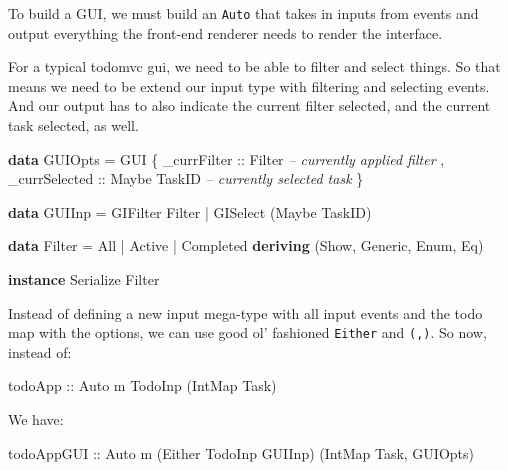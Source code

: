 \documentclass[]{article}
\newenvironment{Shaded}{}{}
\newcommand{\KeywordTok}[1]{\textcolor[rgb]{0.00,0.44,0.13}{\textbf{{#1}}}}
\newcommand{\DataTypeTok}[1]{\textcolor[rgb]{0.56,0.13,0.00}{{#1}}}
\newcommand{\CommentTok}[1]{\textcolor[rgb]{0.38,0.63,0.69}{\textit{{#1}}}}
\newcommand{\OtherTok}[1]{\textcolor[rgb]{0.00,0.44,0.13}{{#1}}}
\newcommand{\FunctionTok}[1]{\textcolor[rgb]{0.02,0.16,0.49}{{#1}}}
\newcommand{\NormalTok}[1]{{#1}}
\begin{document}
To build a GUI, we must build an \texttt{Auto} that takes in inputs from events
and output everything the front-end renderer needs to render the interface.

For a typical todomvc gui, we need to be able to filter and select things. So
that means we need to be extend our input type with filtering and selecting
events. And our output has to also indicate the current filter selected, and the
current task selected, as well.

\begin{Shaded}
\begin{Highlighting}[]
\KeywordTok{data} \DataTypeTok{GUIOpts} \FunctionTok{=} \DataTypeTok{GUI} \NormalTok{\{ _}\OtherTok{currFilter   ::} \DataTypeTok{Filter}        \CommentTok{-- currently applied filter}
                   \NormalTok{, _}\OtherTok{currSelected ::} \DataTypeTok{Maybe} \DataTypeTok{TaskID}  \CommentTok{-- currently selected task}
                   \NormalTok{\}}

\KeywordTok{data} \DataTypeTok{GUIInp} \FunctionTok{=} \DataTypeTok{GIFilter} \DataTypeTok{Filter}
            \FunctionTok{|} \DataTypeTok{GISelect} \NormalTok{(}\DataTypeTok{Maybe} \DataTypeTok{TaskID}\NormalTok{)}

\KeywordTok{data} \DataTypeTok{Filter} \FunctionTok{=} \DataTypeTok{All} \FunctionTok{|} \DataTypeTok{Active} \FunctionTok{|} \DataTypeTok{Completed}
            \KeywordTok{deriving} \NormalTok{(}\DataTypeTok{Show}\NormalTok{, }\DataTypeTok{Generic}\NormalTok{, }\DataTypeTok{Enum}\NormalTok{, }\DataTypeTok{Eq}\NormalTok{)}

\KeywordTok{instance} \DataTypeTok{Serialize} \DataTypeTok{Filter}
\end{Highlighting}
\end{Shaded}

Instead of defining a new input mega-type with all input events and the todo map
with the options, we can use good ol' fashioned \texttt{Either} and
\texttt{(,)}. So now, instead of:

\begin{Shaded}
\begin{Highlighting}[]
\OtherTok{todoApp ::} \DataTypeTok{Auto} \NormalTok{m }\DataTypeTok{TodoInp} \NormalTok{(}\DataTypeTok{IntMap} \DataTypeTok{Task}\NormalTok{)}
\end{Highlighting}
\end{Shaded}

We have:

\begin{Shaded}
\begin{Highlighting}[]
\OtherTok{todoAppGUI ::} \DataTypeTok{Auto} \NormalTok{m (}\DataTypeTok{Either} \DataTypeTok{TodoInp} \DataTypeTok{GUIInp}\NormalTok{) (}\DataTypeTok{IntMap} \DataTypeTok{Task}\NormalTok{, }\DataTypeTok{GUIOpts}\NormalTok{)}
\end{Highlighting}
\end{Shaded}
\end{document}
